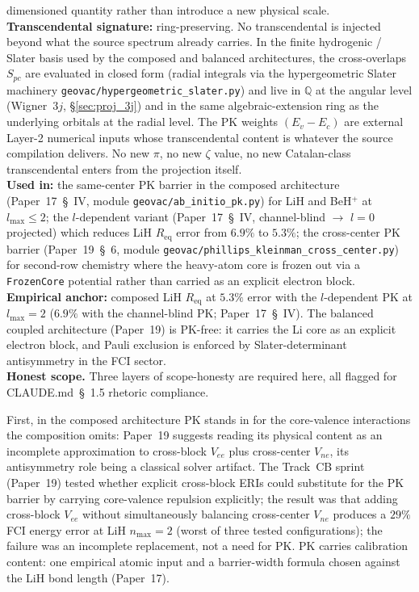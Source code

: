 \documentclass[11pt]{article}
\begin{document}
dimensioned quantity rather than introduce a new physical scale.\\
\textbf{Transcendental signature:} ring-preserving.  No transcendental
is injected beyond what the source spectrum already carries.  In the
finite hydrogenic / Slater basis used by the composed and balanced
architectures, the cross-overlaps $S_{pc}$ are evaluated in closed
form (radial integrals via the hypergeometric Slater machinery
\texttt{geovac/hypergeometric\_slater.py}) and live in $\mathbb{Q}$ at
the angular level (Wigner~$3j$, \S\ref{sec:proj_3j}) and in the same
algebraic-extension ring as the underlying orbitals at the radial
level.  The PK weights $(E_v - E_c)$ are external Layer-2 numerical
inputs whose transcendental content is whatever the source compilation
delivers.  No new $\pi$, no new $\zeta$ value, no new Catalan-class
transcendental enters from the projection itself.\\
\textbf{Used in:} the same-center PK barrier in the composed
architecture (Paper~17~\S~IV, module
\texttt{geovac/ab\_initio\_pk.py}) for LiH and BeH$^+$ at
$l_\text{max} \leq 2$; the $l$-dependent variant
(Paper~17~\S~IV, channel-blind $\to$ $l = 0$ projected) which
reduces LiH $R_\text{eq}$ error from $6.9\%$ to $5.3\%$; the
cross-center PK barrier
(Paper~19~\S~6, module
\texttt{geovac/phillips\_kleinman\_cross\_center.py}) for second-row
chemistry where the heavy-atom core is frozen out via a
\texttt{FrozenCore} potential rather than carried as an explicit
electron block.\\
\textbf{Empirical anchor:} composed LiH $R_\text{eq}$ at $5.3\%$
error with the $l$-dependent PK at $l_\text{max} = 2$ ($6.9\%$ with the
channel-blind PK; Paper~17~\S~IV).  The balanced coupled architecture
(Paper~19) is PK-free: it carries the Li core as an explicit electron
block, and Pauli exclusion is enforced by Slater-determinant
antisymmetry in the FCI sector.\\
\textbf{Honest scope.}  Three layers of scope-honesty are required
here, all flagged for CLAUDE.md~\S~1.5 rhetoric compliance.

First, in the composed architecture PK stands in for the core-valence
interactions the composition omits: Paper~19 \cite{paper19} suggests
reading its physical content as an incomplete approximation to cross-block $V_{ee}$
plus cross-center $V_{ne}$, its antisymmetry role being a classical
solver artifact.  The Track~CB sprint (Paper~19)
tested whether explicit cross-block ERIs could substitute for the PK
barrier by carrying core-valence repulsion explicitly; the result was
that adding cross-block $V_{ee}$ without simultaneously balancing
cross-center $V_{ne}$ produces a $29\%$ FCI energy error at LiH
$n_\text{max}=2$ (worst of three tested configurations); the
failure was an incomplete replacement, not a need for PK.  PK carries
calibration content:
one empirical atomic input and a barrier-width formula chosen against
the LiH bond length (Paper~17).
\end{document}
